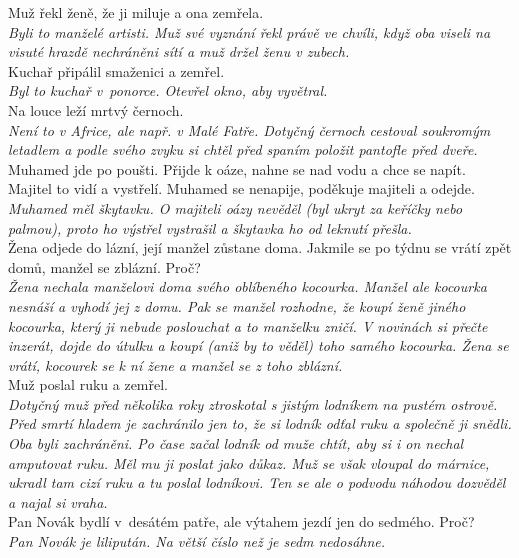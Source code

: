 \begin{multicols}{2}
\noindent
Muž řekl ženě, že ji miluje a ona zemřela.\\[1 mm]
{\sl Byli to manželé artisti. Muž své vyznání řekl právě ve chvíli, 
když oba viseli na visuté hrazdě nechráněni sítí a muž držel 
ženu v zubech.}\\

\noindent
Kuchař připálil smaženici a zemřel.\\[1 mm]
{\sl Byl to kuchař v~ponorce. Otevřel okno, aby vyvětral.}\\

\noindent
Na louce leží mrtvý černoch.\\[1 mm]
{\sl Není to v Africe, ale např. v Malé Fatře. Dotyčný černoch 
cestoval soukromým letadlem a podle svého zvyku si chtěl před 
spaním položit pantofle před dveře.}\\

\noindent
Muhamed jde po poušti. Přijde k oáze, nahne se nad vodu 
a chce se napít. Majitel to vidí a vystřelí. Muhamed se nenapije, 
poděkuje majiteli a odejde.\\[1 mm]
{\sl Muhamed měl škytavku. O majiteli oázy nevěděl (byl ukryt 
za keříčky nebo palmou), proto ho výstřel vystrašil a škytavka 
ho od leknutí přešla.}\\

\noindent
Žena odjede do lázní, její manžel zůstane doma. Jakmile se 
po týdnu se vrátí zpět domů, manžel se zblázní. Proč?\\[1 mm]
{\sl Žena nechala manželovi doma svého oblíbeného kocourka. 
Manžel ale kocourka nesnáší a vyhodí jej z domu. Pak se manžel 
rozhodne, že koupí ženě jiného kocourka, který ji nebude poslouchat 
a to manželku zničí. V novinách si přečte inzerát, dojde do útulku 
a koupí (aniž by to věděl) toho samého kocourka. Žena se vrátí, 
kocourek se k ní žene a manžel se z toho zblázní.}\\

\noindent
Muž poslal ruku a zemřel.\\[1 mm]
{\sl Dotyčný muž před několika roky ztroskotal s jistým lodníkem 
na pustém ostrově. Před smrtí hladem je zachránilo jen to, že 
si lodník odťal ruku a společně ji snědli. Oba byli zachráněni. 
Po čase začal lodník od muže chtít, aby si i on nechal amputovat 
ruku. Měl mu ji poslat jako důkaz. Muž se však vloupal do márnice, 
ukradl tam cizí ruku a tu poslal lodníkovi. Ten se ale o podvodu 
náhodou dozvěděl a najal si vraha.}\\

\noindent
Pan Novák bydlí v~desátém patře, ale výtahem jezdí 
jen do sedmého. Proč?\\[1 mm]
{\sl Pan Novák je lilipután. Na větší číslo než je sedm
nedosáhne.}\\


\end{multicols}

